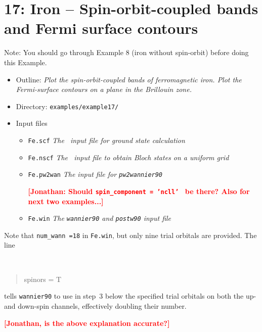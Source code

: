 \documentclass[a4paper,11pt,twoside]{article}
\def\tent#1{\textcolor{red}{#1}}     %
\begin{document}

\cleardoublepage


\section*{17: Iron -- Spin-orbit-coupled bands and
Fermi surface contours}

Note: You should go through Example 8 (iron without spin-orbit) before
doing this Example.
\begin{itemize}
\item{Outline: \it{Plot the spin-orbit-coupled bands of ferromagnetic
      iron.  Plot the Fermi-surface contours on a plane in the
      Brillouin zone.}}
\item{Directory: {\tt examples/example17/}}
\item{Input files}
\begin{itemize}
\item{ {\tt Fe.scf} {\it The \pwscf\ input file for ground state
    calculation}}
\item{ {\tt Fe.nscf}  {\it The \pwscf\ input file to obtain Bloch
    states on a uniform grid}} 
\item{ {\tt Fe.pw2wan}  {\it The input file for {\tt pw2wannier90}}}

\tent{{\bf [Jonathan: Should {\tt spin\_component = 'ncll'
} be there? Also for next two examples...]}}

\item{ {\tt Fe.win}  {\it The {\tt wannier90} and {\tt postw90} input file}}
\end{itemize}
\end{itemize}

Note that {\tt num\_wann =18} in {\tt Fe.win}, but only nine trial
orbitals are provided. The line
  {\tt
\begin{quote}
spinors = T
\end{quote}
}tells {\tt wannier90} to use in step~3 below the specified trial
orbitals on both the up- and down-spin channels, effectively doubling
their number.

\tent{\bf [Jonathan, is the above explanation accurate?]}
\end{document}
